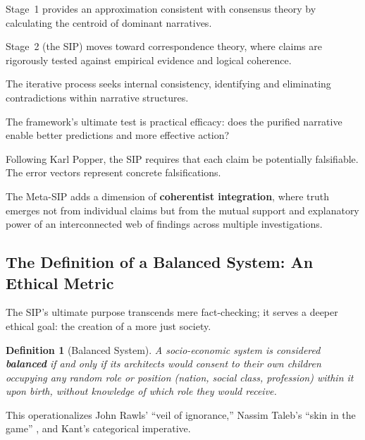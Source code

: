 \documentclass[11pt,a4paper]{article}
\newtheorem{definition}{Definition}[section]
\begin{document}
\begin{description}[style=nextline]
\item[\textbf{Consensus Theory:}] Stage~1 provides an approximation consistent with consensus theory by calculating the centroid of dominant narratives.

\item[\textbf{Correspondence Theory:}] Stage~2 (the SIP) moves toward correspondence theory, where claims are rigorously tested against empirical evidence and logical coherence.

\item[\textbf{Coherence Theory:}] The iterative process seeks internal consistency, identifying and eliminating contradictions within narrative structures.

\item[\textbf{Pragmatic Theory:}] The framework's ultimate test is practical efficacy: does the purified narrative enable better predictions and more effective action?

\item[\textbf{Falsificationist Epistemology:}] Following Karl Popper, the SIP requires that each claim be potentially falsifiable. The error vectors represent concrete falsifications.
\end{description}

The Meta-SIP adds a dimension of \textbf{coherentist integration}, where truth emerges not from individual claims but from the mutual support and explanatory power of an interconnected web of findings across multiple investigations.

\subsection{The Definition of a Balanced System: An Ethical Metric}

The SIP's ultimate purpose transcends mere fact-checking; it serves a deeper ethical goal: the creation of a more just society.

\begin{definition}[Balanced System]
A socio-economic system is considered \textbf{balanced} if and only if its architects would consent to their own children occupying any random role or position (nation, social class, profession) within it upon birth, without knowledge of which role they would receive.
\end{definition}

This operationalizes John Rawls' ``veil of ignorance,'' Nassim Taleb's ``skin in the game'' \citep{Taleb2012}, and Kant's categorical imperative.
\end{document}

